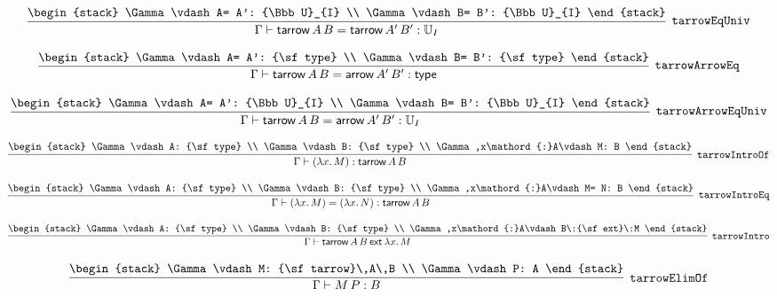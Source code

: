 \[
\infer[{\tt tarrowEqUniv}]{\Gamma \vdash {\sf tarrow}\,A\,B= {\sf tarrow}\,A'\,B': {\Bbb U}_{I}}{
\begin{stack}
\Gamma \vdash A= A': {\Bbb U}_{I}
\\
\Gamma \vdash B= B': {\Bbb U}_{I}
\end{stack}}
\]

\[
\infer[{\tt tarrowArrowEq}]{\Gamma \vdash {\sf tarrow}\,A\,B= {\sf arrow}\,A'\,B': {\sf type}}{
\begin{stack}
\Gamma \vdash A= A': {\sf type}
\\
\Gamma \vdash B= B': {\sf type}
\end{stack}}
\]

\[
\infer[{\tt tarrowArrowEqUniv}]{\Gamma \vdash {\sf tarrow}\,A\,B= {\sf arrow}\,A'\,B': {\Bbb U}_{I}}{
\begin{stack}
\Gamma \vdash A= A': {\Bbb U}_{I}
\\
\Gamma \vdash B= B': {\Bbb U}_{I}
\end{stack}}
\]

\[
\infer[{\tt tarrowIntroOf}]{\Gamma \vdash (\lambda x.\,M): {\sf tarrow}\,A\,B}{
\begin{stack}
\Gamma \vdash A: {\sf type}
\\
\Gamma \vdash B: {\sf type}
\\
\Gamma ,x\mathord{:}A\vdash M: B
\end{stack}}
\]

\[
\infer[{\tt tarrowIntroEq}]{\Gamma \vdash (\lambda x.\,M)= (\lambda x.\,N): {\sf tarrow}\,A\,B}{
\begin{stack}
\Gamma \vdash A: {\sf type}
\\
\Gamma \vdash B: {\sf type}
\\
\Gamma ,x\mathord{:}A\vdash M= N: B
\end{stack}}
\]

\[
\infer[{\tt tarrowIntro}]{\Gamma \vdash {\sf tarrow}\,A\,B\:{\sf ext}\:\lambda x.\,M}{
\begin{stack}
\Gamma \vdash A: {\sf type}
\\
\Gamma \vdash B: {\sf type}
\\
\Gamma ,x\mathord{:}A\vdash B\:{\sf ext}\:M
\end{stack}}
\]

\[
\infer[{\tt tarrowElimOf}]{\Gamma \vdash M\,P: B}{
\begin{stack}
\Gamma \vdash M: {\sf tarrow}\,A\,B
\\
\Gamma \vdash P: A
\end{stack}}
\]


